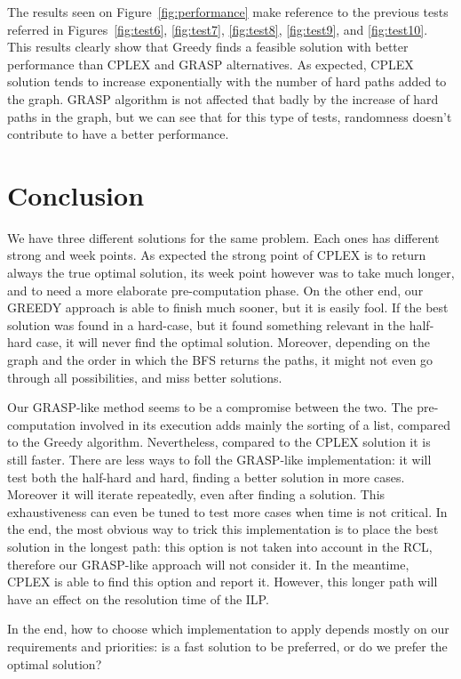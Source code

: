 \documentclass[11pt,a4paper]{article}
\begin{document}
The results seen on Figure~\ref{fig:performance} make reference to the previous tests referred in Figures~\ref{fig:test6}, \ref{fig:test7}, \ref{fig:test8}, \ref{fig:test9}, and \ref{fig:test10}. This results clearly show that Greedy finds a feasible solution with better performance than CPLEX and GRASP alternatives. As expected, CPLEX solution tends to increase exponentially with the number of hard paths added to the graph. GRASP algorithm is not affected that badly by the increase of hard paths in the graph, but we can see that for this type of tests, randomness doesn't contribute to have a better performance.

\section{Conclusion}
We have three different solutions for the same problem. Each ones has different strong and week points. As expected the strong point of CPLEX is to return always the true optimal solution, its week point however was to take much longer, and to need a more elaborate pre-computation phase.
On the other end, our GREEDY approach is able to finish much sooner, but it is easily fool. If the best solution was found in a hard-case, but it found something relevant in the half-hard case, it will never find the optimal solution. Moreover, depending on the graph and the order in which the BFS returns the paths, it might not even go through all possibilities, and miss better solutions.

Our GRASP-like method seems to be a compromise between the two. The pre-computation involved in its execution adds mainly the sorting of a list, compared to the Greedy algorithm. Nevertheless, compared to the CPLEX solution it is still faster. There are less ways to foll the GRASP-like implementation: it will test both the half-hard and hard, finding a better solution in more cases. Moreover it will iterate repeatedly, even after finding a solution. This exhaustiveness can even be tuned to test more cases when time is not critical. In the end, the most obvious way to trick this implementation is to place the best solution in the longest path: this option is not taken into account in the RCL, therefore our GRASP-like approach will not consider it. In the meantime, CPLEX is able to find this option and report it. However, this longer path will have an effect on the resolution time of the ILP.

In the end, how to choose which implementation to apply depends mostly on our requirements and priorities: is a fast solution to be preferred, or do we prefer the optimal solution?
\end{document}
